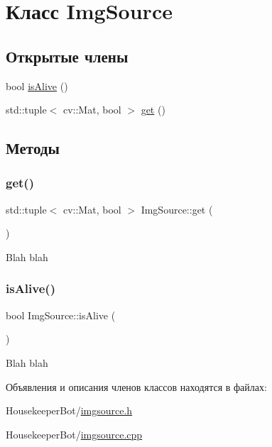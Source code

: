 \hypertarget{classImgSource}{}\section{Класс Img\+Source}
\label{classImgSource}
\subsection*{Открытые члены}
\begin{DoxyCompactItemize}
\item 
bool \hyperlink{classImgSource_a31462700a8fbb18f48198e3b3a12c7c6}{is\+Alive} ()
\item 
std\+::tuple$<$ cv\+::\+Mat, bool $>$ \hyperlink{classImgSource_adf1ee06394c4a69ccbef8167f7f9ac49}{get} ()
\end{DoxyCompactItemize}


\subsection{Методы}
\mbox{\label{classImgSource_adf1ee06394c4a69ccbef8167f7f9ac49}} 
\subsubsection{\texorpdfstring{get()}{get()}}
{\footnotesize\ttfamily std\+::tuple$<$ cv\+::\+Mat, bool $>$ Img\+Source\+::get (\begin{DoxyParamCaption}{ }\end{DoxyParamCaption})}

Blah blah \mbox{\label{classImgSource_a31462700a8fbb18f48198e3b3a12c7c6}} 
\subsubsection{\texorpdfstring{is\+Alive()}{isAlive()}}
{\footnotesize\ttfamily bool Img\+Source\+::is\+Alive (\begin{DoxyParamCaption}{ }\end{DoxyParamCaption})}

Blah blah 

Объявления и описания членов классов находятся в файлах\+:\begin{DoxyCompactItemize}
\item 
Housekeeper\+Bot/\hyperlink{imgsource_8h}{imgsource.\+h}\item 
Housekeeper\+Bot/\hyperlink{imgsource_8cpp}{imgsource.\+cpp}\end{DoxyCompactItemize}
